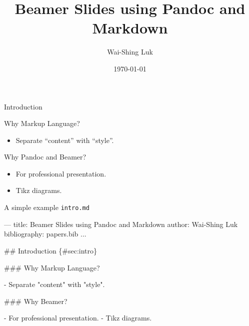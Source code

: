 \documentclass[10pt,ignorenonframetext,serif,onlymath]{beamer}
\title{Beamer Slides using Pandoc and Markdown}
\author{Wai-Shing Luk}
\institute{Fudan University}
\date{\today}
\newenvironment{Shaded}{}{}
\newcommand{\FloatTok}[1]{\textcolor[rgb]{0.25,0.63,0.44}{#1}}
\newcommand{\FunctionTok}[1]{\textcolor[rgb]{0.02,0.16,0.49}{#1}}
\newcommand{\NormalTok}[1]{#1}
\providecommand{\tightlist}{%
  \setlength{\itemsep}{0pt}\setlength{\parskip}{0pt}}
\begin{document}
\frame{\titlepage}

\begin{frame}{Introduction}
\protect\hypertarget{sec:intro}{}

\begin{block}{Why Markup Language?}

\begin{itemize}
\tightlist
\item
  Separate “content” with “style”.
\end{itemize}

\end{block}

\begin{block}{Why Pandoc and Beamer?}

\begin{itemize}
\tightlist
\item
  For professional presentation.
\item
  Tikz diagrams.
\end{itemize}

\end{block}

\end{frame}

\begin{frame}[fragile]{A simple example \texttt{intro.md}}
\protect\hypertarget{sec:a-simple-example-intro.md}{}

\begin{Shaded}
\begin{Highlighting}[]
\NormalTok{---}
\NormalTok{title: Beamer Slides using Pandoc and Markdown}
\NormalTok{author: Wai-Shing Luk}
\NormalTok{bibliography: papers.bib}
\NormalTok{...}

\FunctionTok{## Introduction \{#sec:intro\}}

\FunctionTok{### Why Markup Language?}

\NormalTok{- }\FloatTok{  Separate "content" with "style".}

\FunctionTok{### Why Beamer?}

\NormalTok{- }\FloatTok{  For professional presentation.}
\FloatTok{-   Tikz diagrams.}
\end{Highlighting}
\end{Shaded}

\end{frame}
\end{document}
